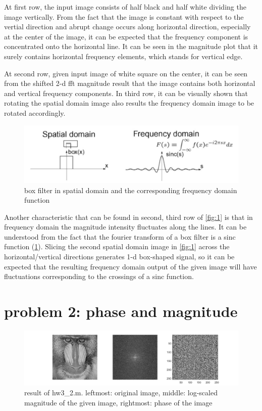 \documentclass[extendedabs]{bmvc2k}
\begin{document}
At first row, the input image consists of half black and half white dividing the image vertically.
From the fact that the image is constant with respect to the vertial direction and abrupt change occurs
along horizontal direction, especially at the center of the image, it can be expected that the frequency
component is concentrated onto the horizontal line. It can be seen in the magnitude plot that it surely
contains horizontal frequency elements, which stands for vertical edge.

At second row, given input image of white square on the center, it can be seen from
the shifted 2-d fft magnitude result that the image contains both horizontal and vertical frequency
components. In third row, it can be visually shown that rotating the spatial domain image also
results the frequency domain image to be rotated accordingly.

\begin{figure}[h]
    \centering
    \includegraphics[width=\linewidth]{hw3_1_2}
    \caption{box filter in spatial domain and the corresponding frequency domain function}
    \label{fig:8}
\end{figure}

Another characteristic that can be found in second, third row of \figurename{\ref{fig:1}} is 
that in frequency domain the magnitude intensity fluctuates along the lines. It can be understood from the fact 
that the fourier transform of a box filter is a sinc function (\figurename{\ref{fig:8}}). 
Slicing the second spatial domain image in \figurename{\ref{fig:1}}
across the horizontal/vertical directions generates 1-d box-shaped signal, so it can be expected that 
the resulting frequency domain output of the given image will have fluctuations corresponding to the crossings
of a sinc function. 

\section*{problem 2: phase and magnitude}

\begin{figure}[h]
    \centering
    \includegraphics[width=\linewidth]{hw3_2_1}
    \caption{result of hw3\_2.m. leftmost: original image, middle: log-scaled magnitude
    of the given image, rightmost: phase of the image}
    \label{fig:2}
\end{figure}
\end{document}
